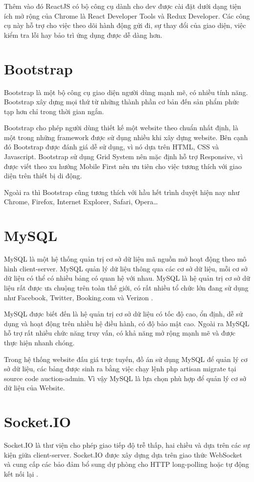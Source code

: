 \documentclass[../DoAn.tex]{subfiles}
\begin{document}
Thêm vào đó ReactJS có bộ công cụ dành cho dev được cài đặt dưới dạng tiện ích mở rộng của Chrome là React Developer Tools và Redux Developer. Các công cụ này hỗ trợ cho việc theo dõi hành động gửi đi, sự thay đổi của giao diện, việc kiểm tra lỗi hay bảo trì ứng dụng được dễ dàng hơn.
\section{Bootstrap}
\label{section:3.3}
Bootstrap là một bộ công cụ giao diện người dùng mạnh mẽ, có nhiều tính năng. Bootstrap xây dựng mọi thứ từ những thành phần cơ bản đến sản phẩm phức tạp hơn chỉ trong thời gian ngắn\cite{Bootstrap}.

Bootstrap cho phép người dùng thiết kế một website theo chuẩn nhất định, là một trong những framework được sử dụng nhiều khi xây dựng website. Bên cạnh đó Bootstrap được đánh giá dễ sử dụng, vì nó dựa trên HTML, CSS và Javascript. Bootstrap sử dụng Grid System nên mặc định hỗ trợ Responsive, vì được viết theo xu hướng Mobile First nên ưu tiên cho việc tương thích với giao diện trên thiết bị di động.

Ngoài ra thì Bootstrap cũng tương thích với hầu hết trình duyệt hiện nay như Chrome, Firefox, Internet Explorer, Safari, Opera…
\section{MySQL}
\label{section:3.4}
MySQL là một hệ thống quản trị cơ sở dữ liệu mã nguồn mở hoạt động theo mô hình client-server. MySQL quản lý dữ liệu thông qua các cơ sở dữ liệu, mỗi cơ sở dữ liệu có thể có nhiều bảng có quan hệ với nhau. MySQL là hệ quản trị cơ sở dữ liệu rất được ưa chuộng trên toàn thế giới, có rất nhiều tổ chức lớn đang sử dụng như Facebook, Twitter, Booking.com và Verizon \cite{MySQL}.

MySQL được biết đến là hệ quản trị cơ sở dữ liệu có tốc độ cao, ổn định, dễ sử dụng và hoạt động trên nhiều hệ điều hành, có độ bảo mật cao. Ngoài ra MySQL hỗ trợ rất nhiều chức năng truy vấn, có khả năng mở rộng mạnh mẽ và được thực hiện nhanh chóng.

Trong hệ thống website đấu giá trực tuyến, đồ án sử dụng MySQL để quản lý cơ sở dữ liệu, các bảng được sinh ra bằng việc chạy lệnh php artisan migrate tại source code auction-admin. Vì vậy MySQL là lựa chọn phù hợp để quản lý cơ sở dữ liệu của Website.
\section{Socket.IO}
\label{section:3.5}
Socket.IO là thư viện cho phép giao tiếp độ trễ thấp, hai chiều và dựa trên các sự kiện giữa client-server. Socket.IO được xây dựng dựa trên giao thức WebSocket và cung cấp các bảo đảm bổ sung dự phòng cho HTTP long-polling hoặc tự động kết nối lại \cite{Socket.IO}.
\end{document}
